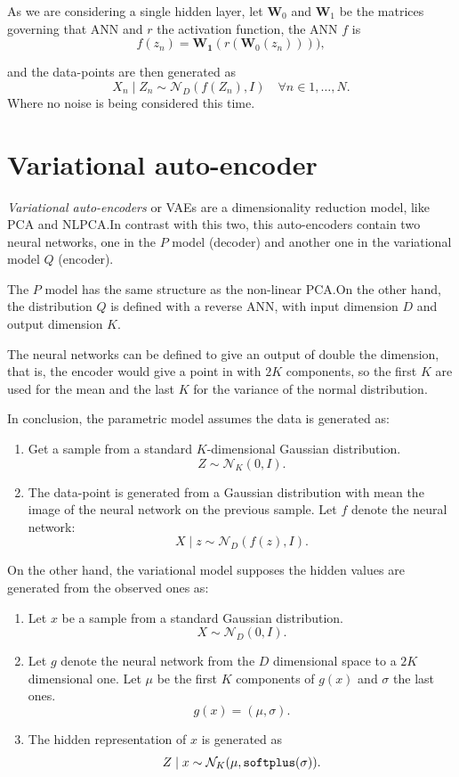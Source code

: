 As we are considering a single hidden layer, let \(\bm{W}_{0}\) and \(\bm{W}_{1}\) be the matrices governing that ANN and \(r\) the activation function, the ANN \(f\) is
\[
  f(z_{n}) = \bm{W_{1}}(r(\bm{W}_{0}(z_{n})))),
\]

and the data-points are then generated as
\[
  X_{n}\mid Z_{n} \sim \mathcal{N}_{D}(f(Z_{n}), I) \quad \forall n \in 1,\dots,N.
\]
Where no noise is being considered this time.

\section{Variational auto-encoder}\label{sec:vae}

\emph{Variational auto-encoders} or VAEs are a dimensionality reduction model, like PCA and NLPCA.\@ In contrast with this two, this auto-encoders contain two neural networks, one in the \(P\) model (decoder) and another one in the variational model \(Q\) (encoder).

The \(P\) model has the same structure as the non-linear PCA.\@ On the other hand, the  distribution \(Q\) is defined with a reverse ANN, with input dimension \(D\) and output dimension \(K\).

The neural networks can be defined to give an output of double the dimension, that is, the encoder would give a point in with \( 2K \) components, so the first \( K \) are used for the mean and the last \( K \) for the variance of the normal distribution.

In conclusion, the parametric model assumes the data is generated as:
\begin{enumerate}
  \item Get a sample from a standard \(K\)-dimensional Gaussian distribution.
    \[
    Z \sim \mathcal{N}_{K}(0,I).
    \]
  \item The data-point is generated from a Gaussian distribution with mean the image of the neural network on the previous sample. Let \(f\) denote the neural network:
    \[
    X \mid z \sim \mathcal{N}_{D}(f(z), I).
    \]
\end{enumerate}
On the other hand, the variational model supposes the hidden values are generated from the observed ones as:
\begin{enumerate}
  \item Let \(x\) be a sample from a standard Gaussian distribution.
    \[
    X \sim \mathcal{N}_{D}(0,I).
    \]
  \item Let \(g\) denote the neural network from the \(D\) dimensional space to a \(2K\) dimensional one. Let \(\mu\) be the first \(K\) components of \(g(x)\) and \(\sigma\) the last ones.
    \[
    g(x) = (\mu, \sigma).
    \]
  \item The hidden representation of \(x\) is generated as
    \[
    Z \mid x \sim \mathcal{N}_{K}(\mu, \text{\texttt{softplus}}(\sigma)).
    \]
\end{enumerate}

